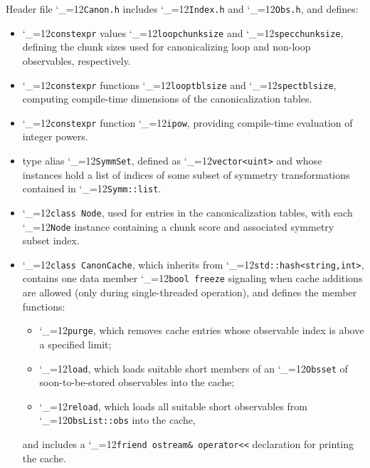 \documentclass [12pt]{article}
\makeatletter
\renewcommand{\tt}{\begingroup\catcode`_=12\def\_{\string_}\tt@}
\newcommand{\tt@}[1]{\texttt{#1}\endgroup}
\makeatother
\begin{document}
Header file \tt{Canon.h} includes
\tt{Index.h} and
\tt{Obs.h},
and defines:
\begin{itemize}\advance\itemsep -3pt
\item
    \tt{constexpr} values
    \tt{loopchunksize} and \tt{specchunksize},
    defining the chunk sizes used for canonicalizing loop
    and non-loop observables, respectively.

\item
    \tt{constexpr} functions
    \tt{looptblsize} and \tt{spectblsize},
    computing compile-time dimensions of the
    canonicalization tables.

\item
    \tt{constexpr} function \tt{ipow}, providing
    compile-time evaluation of integer powers.

\item
    type alias \tt{SymmSet}, defined as \tt{vector<uint>}
    and whose instances hold a list of indices
    of some subset of symmetry transformations contained
    in \tt{Symm::list}.

\item
    \tt{class Node}, used for entries in the
    canonicalization tables, with each \tt{Node}
    instance containing a chunk score and associated
    symmetry subset index.

\item
    \tt{class CanonCache}, which inherits
    from \tt{std::hash<string,int>},
    contains one data member
    \tt{bool freeze} signaling when cache
    additions are allowed (only during
    single-threaded operation),
    and defines the member functions:
    \begin{itemize}
    \item
	\tt{purge}, which removes cache entries whose
	observable index is above a specified limit;
    \item
	\tt{load}, which loads suitable short members
	of an \tt{Obsset} of soon-to-be-stored observables
	into the cache;
    \item
	\tt{reload}, which loads all suitable short
	observables from \tt{ObsList::obs} into the cache,
    \end{itemize}
    and includes a \tt{friend ostream\& operator<<} declaration
    for printing the cache.


\end{itemize}
\end{document}
